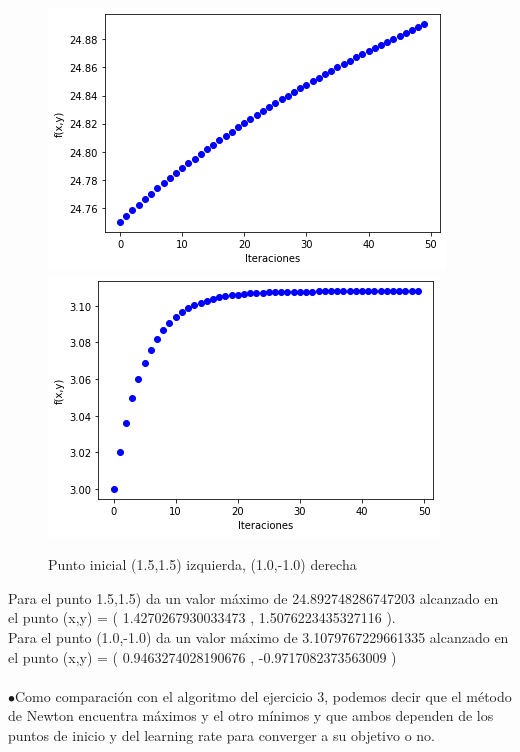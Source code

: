 \documentclass[12pt]{article}
\begin{document}
\begin{figure}[H]
\centering
\includegraphics[scale=0.45]{Images/MN15.png} 
\includegraphics[scale=0.45]{Images/MN1-101.png} 
\caption{Punto inicial (1.5,1.5) izquierda, (1.0,-1.0) derecha}
\label{etiqueta}
\end{figure}
Para el punto 1.5,1.5) da un valor máximo de 24.892748286747203 alcanzado en el punto (x,y) = ( 1.4270267930033473 ,  1.5076223435327116 ). \\
Para el punto (1.0,-1.0) da un valor máximo de 3.1079767229661335 alcanzado en el punto (x,y) = ( 0.9463274028190676 ,  -0.9717082373563009 ) \\\\
$\bullet$Como comparación con el algoritmo del ejercicio 3, podemos decir que el método de Newton encuentra máximos y el otro mínimos y que ambos dependen de los puntos de inicio y del learning rate para converger a su objetivo o no.


 
\end{document}
